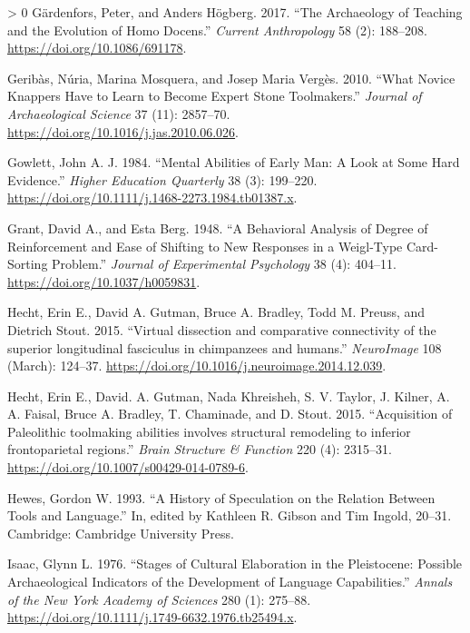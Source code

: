 \documentclass[smallextended]{svjour3}       %
\newlength{\cslhangindent}
\newenvironment{CSLReferences}[3] %
 {%
  \setlength{\parindent}{0pt}
  \ifodd #1 \everypar{\setlength{\hangindent}{\cslhangindent}}\ignorespaces\fi
  \ifnum #2 > 0
  \setlength{\parskip}{#3\baselineskip}
  \fi
 }%
 {}
\begin{document}
\begin{CSLReferences}{1}{0}
\leavevmode\hypertarget{ref-guxe4rdenfors2017}{}%
Gärdenfors, Peter, and Anders Högberg. 2017. {``The Archaeology of
Teaching and the Evolution of Homo Docens.''} \emph{Current
Anthropology} 58 (2): 188--208. \url{https://doi.org/10.1086/691178}.

\leavevmode\hypertarget{ref-geribuxe0s2010}{}%
Geribàs, Núria, Marina Mosquera, and Josep Maria Vergès. 2010. {``What
Novice Knappers Have to Learn to Become Expert Stone Toolmakers.''}
\emph{Journal of Archaeological Science} 37 (11): 2857--70.
\url{https://doi.org/10.1016/j.jas.2010.06.026}.

\leavevmode\hypertarget{ref-gowlett1984}{}%
Gowlett, John A. J. 1984. {``Mental Abilities of Early Man: A Look at
Some Hard Evidence.''} \emph{Higher Education Quarterly} 38 (3):
199--220. \url{https://doi.org/10.1111/j.1468-2273.1984.tb01387.x}.

\leavevmode\hypertarget{ref-grant1948}{}%
Grant, David A., and Esta Berg. 1948. {``A Behavioral Analysis of Degree
of Reinforcement and Ease of Shifting to New Responses in a Weigl-Type
Card-Sorting Problem.''} \emph{Journal of Experimental Psychology} 38
(4): 404--11. \url{https://doi.org/10.1037/h0059831}.

\leavevmode\hypertarget{ref-hecht2015b}{}%
Hecht, Erin E., David A. Gutman, Bruce A. Bradley, Todd M. Preuss, and
Dietrich Stout. 2015. {``Virtual dissection and comparative connectivity
of the superior longitudinal fasciculus in chimpanzees and humans.''}
\emph{NeuroImage} 108 (March): 124--37.
\url{https://doi.org/10.1016/j.neuroimage.2014.12.039}.

\leavevmode\hypertarget{ref-hecht2015a}{}%
Hecht, Erin E., David. A. Gutman, Nada Khreisheh, S. V. Taylor, J.
Kilner, A. A. Faisal, Bruce A. Bradley, T. Chaminade, and D. Stout.
2015. {``Acquisition of Paleolithic toolmaking abilities involves
structural remodeling to inferior frontoparietal regions.''} \emph{Brain
Structure \& Function} 220 (4): 2315--31.
\url{https://doi.org/10.1007/s00429-014-0789-6}.

\leavevmode\hypertarget{ref-hewes1993}{}%
Hewes, Gordon W. 1993. {``A History of Speculation on the Relation
Between Tools and Language.''} In, edited by Kathleen R. Gibson and Tim
Ingold, 20--31. Cambridge: Cambridge University Press.

\leavevmode\hypertarget{ref-isaac1976}{}%
Isaac, Glynn L. 1976. {``Stages of Cultural Elaboration in the
Pleistocene: Possible Archaeological Indicators of the Development of
Language Capabilities.''} \emph{Annals of the New York Academy of
Sciences} 280 (1): 275--88.
\url{https://doi.org/10.1111/j.1749-6632.1976.tb25494.x}.


\end{CSLReferences}
\end{document}
